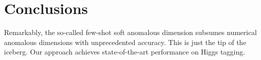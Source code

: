 \section{Conclusions}\label{sec:conclusions}

Remarkably, the so-called few-shot soft anomalous dimension subsumes
numerical anomalous dimensions with unprecedented accuracy. This is just
the tip of the iceberg. Our approach achieves state-of-the-art
performance on Higgs tagging.

